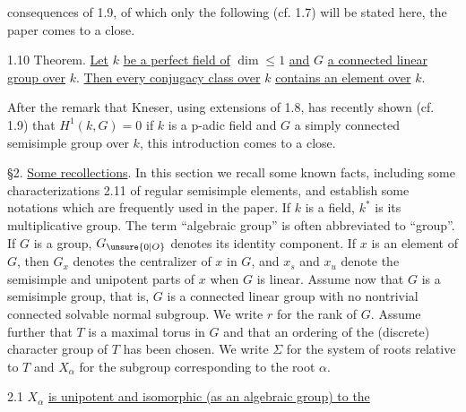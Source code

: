 
consequences of 1.9, of which only the following (cf. 1.7) will be stated here, the paper comes to a close.

1.10 Theorem. \uline{Let} $k$ \uline{be a perfect field of} $\dim\leq1$ \uline{and} $G$ \uline{a connected linear group over} $k$. \uline{Then every conjugacy class over} $k$ \uline{contains an element over} $k$.

After the remark that Kneser, using extensions of 1.8, has recently shown (cf. 1.9) that $H^1(k,G)=0$ if $k$ is a p-adic field and $G$ a simply connected semisimple group over $k$, this introduction comes to a close.

\S2. \uline{Some recollections}. In this section we recall some known facts, including some characterizations 2.11 of regular semisimple elements, and establish some notations which are frequently used in the paper. If $k$ is a field, $k^*$ is its multiplicative group. The term ``algebraic group'' is often abbreviated to ``group''. If $G$ is a group, $G_{\unsure{0|O}}$ denotes its identity component. If $x$ is an element of $G$, then $G_x$ denotes the centralizer of $x$ in $G$, and $x_s$ and $x_u$ denote the semisimple and unipotent parts of $x$ when $G$ is linear. Assume now that $G$ is a semisimple group, that is, $G$ is a connected linear group with no nontrivial connected solvable normal subgroup. We write $r$ for the rank of $G$. Assume further that $T$ is a maximal torus in $G$ and that an ordering of the (discrete) character group of $T$ has been chosen. We write $\Sigma$ for the system of roots relative to $T$ and $X_\alpha$ for the subgroup corresponding to the root $\alpha$.

2.1 $X_\alpha$ \uline{is unipotent and isomorphic (as an algebraic group) to the}
